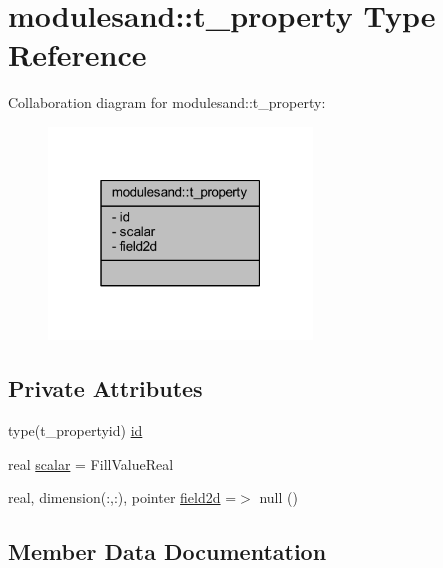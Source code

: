 \hypertarget{structmodulesand_1_1t__property}{}\section{modulesand\+:\+:t\+\_\+property Type Reference}
\label{structmodulesand_1_1t__property}


Collaboration diagram for modulesand\+:\+:t\+\_\+property\+:\nopagebreak
\begin{figure}[H]
\begin{center}
\leavevmode
\includegraphics[width=199pt]{structmodulesand_1_1t__property__coll__graph}
\end{center}
\end{figure}
\subsection*{Private Attributes}
\begin{DoxyCompactItemize}
\item 
type(t\+\_\+propertyid) \mbox{\hyperlink{structmodulesand_1_1t__property_a6497eb65f7326ef3fdb99c3c26823d44}{id}}
\item 
real \mbox{\hyperlink{structmodulesand_1_1t__property_a51b5d325598b9c09a38911eb1a29b339}{scalar}} = Fill\+Value\+Real
\item 
real, dimension(\+:,\+:), pointer \mbox{\hyperlink{structmodulesand_1_1t__property_ac869044e9a8e44a096ad0c103403249b}{field2d}} =$>$ null ()
\end{DoxyCompactItemize}


\subsection{Member Data Documentation}
\mbox{\label{structmodulesand_1_1t__property_ac869044e9a8e44a096ad0c103403249b}} 
